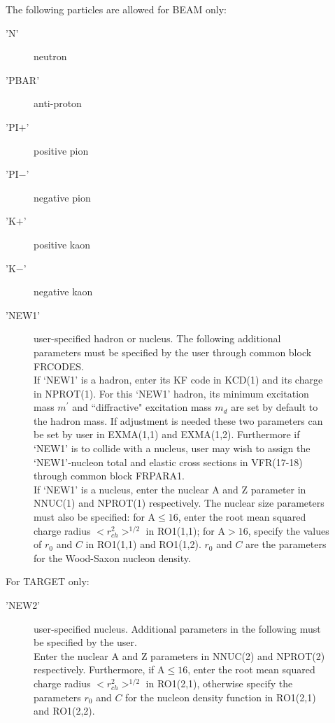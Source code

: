 \begin{itemize}
\begin{description}
\item[          ] The following particles are allowed for BEAM only:
\begin{description}
     \item[ 'N'  ] neutron
     \item['PBAR'] anti-proton
     \item['PI$+$' ] positive pion
     \item['PI$-$' ] negative pion
     \item[ 'K$+$' ] positive kaon
     \item[ 'K$-$' ] negative kaon
     \item['NEW1'] user-specified hadron or nucleus. 
               The following additional parameters must be specified by the user
               through common block FRCODES. \\
               If `NEW1' is a hadron, enter its KF code \cite{datag}
               in KCD(1) and its charge in NPROT(1).
               For this `NEW1' hadron, its minimum excitation mass $m^\prime$
               and ``diffractive" excitation mass $m_d$ are set by default
               to the hadron mass.  If adjustment is needed these two
               parameters can be set by user in EXMA(1,1) and EXMA(1,2).   
               Furthermore if `NEW1' is to collide with a nucleus, 
               user may wish to assign the
               `NEW1'-nucleon total and elastic cross sections
               in VFR(17-18) through common block FRPARA1. \\
               If `NEW1' is a nucleus, enter the nuclear
               A and Z parameter in NNUC(1) and NPROT(1) respectively.
    	       The nuclear size parameters must also be specified: 
               for A$\leq 16$, enter the root mean squared charge radius
               $<r^2_{ch}>^{1/2}$ in RO1(1,1);  
               for A$> 16$, specify the values of $r_0$ 
               and $C$ in RO1(1,1) and RO1(1,2). $r_0$ and $C$ are
               the parameters for the Wood-Saxon nucleon density. 
\end{description}

\item[          ] For TARGET only:
\begin{description}
     \item['NEW2'] user-specified nucleus. Additional parameters
                   in the following must be specified by the user. \\
                   Enter the nuclear A and Z parameters in NNUC(2) and
                   NPROT(2) respectively. Furthermore,
                   if A$\leq 16$, enter the root mean squared charge radius
                   $<r^2_{ch}>^{1/2}$ in RO1(2,1), otherwise specify 
                   the parameters $r_0$ and $C$ for the 
                   nucleon density function in RO1(2,1) and RO1(2,2). 
\end{description}


\end{description}
\end{itemize}
